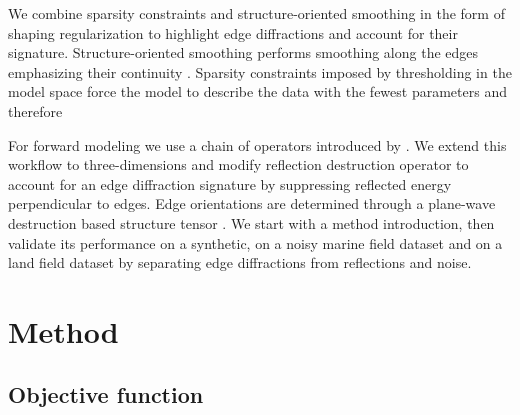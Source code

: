 We combine sparsity constraints and structure-oriented smoothing in the form of shaping regularization \cite[]{fomel2007shaping} to highlight edge diffractions and
account for their signature. Structure-oriented smoothing performs smoothing along the edges emphasizing their continuity \cite[]{hale2009structure}. 
Sparsity constraints imposed by thresholding in the model space force the model to describe the data with the fewest parameters and 
therefore 

For forward modeling we use a chain of operators introduced by \cite{merzlikin2016least}. We extend this workflow to three-dimensions and modify reflection destruction operator
to account for an edge diffraction signature by suppressing reflected energy perpendicular to edges. Edge orientations are determined through a plane-wave destruction based structure tensor
\cite[]{merzlikin2017unconventional}. We start with a method introduction, then validate its performance on a synthetic, on a noisy marine field dataset and
on a land field dataset by separating edge diffractions from reflections and noise.

\section{Method}

\subsection{Objective function}
  
